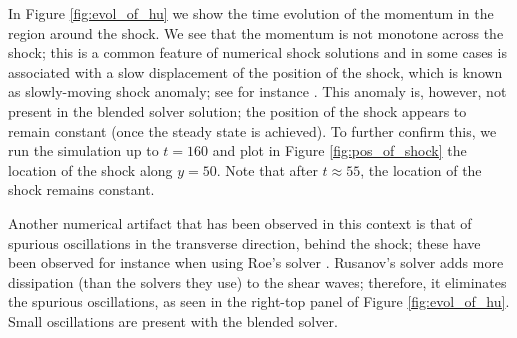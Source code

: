 \documentclass[preprint, 11pt]{article}
\begin{document}
{\color{OliveGreen}
  In Figure \ref{fig:evol_of_hu} we show the time evolution of the momentum in the region around the shock.
  We see that the momentum is not monotone across the shock; this is a common feature of numerical shock
  solutions and in some cases is associated with a slow displacement of the position of the shock,
  which is known as slowly-moving shock anomaly; see for instance \cite{navas2019improved, zaide2012numerical}.
  This anomaly is, however, not present in the blended solver solution;
  the position of the shock appears to remain constant (once the steady state
  is achieved).
  To further confirm this, we run the simulation up to $t=160$ and plot in
  Figure \ref{fig:pos_of_shock} the location of the shock along $y=50$.
  Note that after $t\approx 55$, the location of the shock remains constant.
  
  Another numerical artifact that has been observed in this context is that of
  spurious oscillations in the transverse direction, behind the shock; these have been
  observed for instance when using Roe's solver \cite{navas2019improved}.
  Rusanov's solver adds more dissipation (than the solvers they use) to the shear waves; therefore,
  it eliminates the spurious oscillations,
  as seen in the right-top panel of Figure \ref{fig:evol_of_hu}. Small oscillations are present with the blended solver.
 
}
\end{document}
